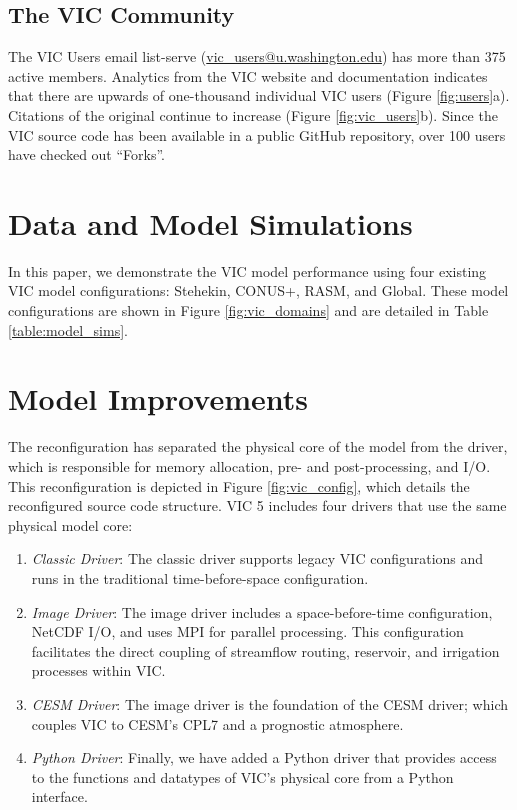 \documentclass[gmd, manuscript]{copernicus}
\begin{document}
  \subsection{The VIC Community}
    The VIC Users email list-serve (\url{vic_users@u.washington.edu}) has more than 375 active members.
    Analytics from the VIC website and documentation indicates that there are upwards of one-thousand individual VIC users (Figure \ref{fig:users}a).
    Citations of the original \citep{Liang_1994} continue to increase (Figure \ref{fig:vic_users}b).
    Since the VIC source code has been available in a public GitHub repository, over 100 users have checked out ``Forks''.

\section{Data and Model Simulations}
  In this paper, we demonstrate the VIC model performance using four existing VIC model configurations: Stehekin, CONUS+, RASM, and Global.
  These model configurations are shown in Figure \ref{fig:vic_domains} and are detailed in Table \ref{table:model_sims}.

\section{Model Improvements}
The reconfiguration has separated the physical core of the model from the driver, which is responsible for memory allocation, pre- and post-processing, and I/O.
This reconfiguration is depicted in Figure \ref{fig:vic_config}, which details the reconfigured source code structure.
VIC 5 includes four drivers that use the same physical model core:
\begin{enumerate}
  \item \textit{Classic Driver}: The classic driver supports legacy VIC configurations and runs in the traditional time-before-space configuration.
  \item \textit{Image Driver}: The image driver includes a space-before-time configuration, NetCDF I/O, and uses MPI for parallel processing.
  This configuration facilitates the direct coupling of streamflow routing, reservoir, and irrigation processes within VIC.
  \item \textit{CESM Driver}: The image driver is the foundation of the CESM driver; which couples VIC to CESM’s CPL7 and a prognostic atmosphere.
  \item \textit{Python Driver}: Finally, we have added a Python driver that provides access to the functions and datatypes of VIC’s physical core from a Python interface.
\end{enumerate}
\end{document}

